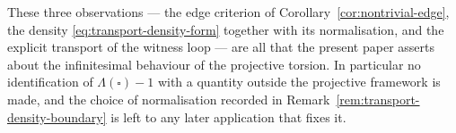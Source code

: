 These three observations --- the edge criterion of
Corollary~\ref{cor:nontrivial-edge}, the density
\eqref{eq:transport-density-form} together with its normalisation, and the
explicit transport of the witness loop --- are all that the present paper
asserts about the infinitesimal behaviour of the projective torsion.  In
particular no identification of $\Lambda(\square)-1$ with a quantity outside the
projective framework is made, and the choice of normalisation recorded in
Remark~\ref{rem:transport-density-boundary} is left to any later application
that fixes it.
